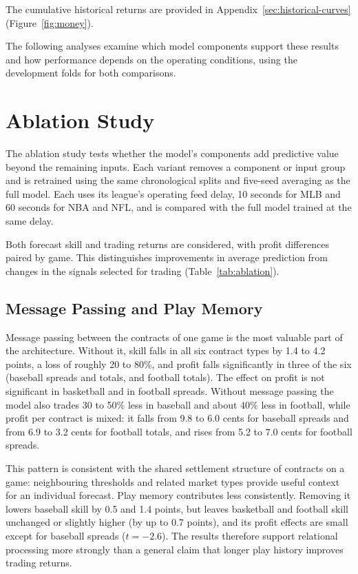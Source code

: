 \documentclass[12pt,a4paper,oneside]{report}
\begin{document}





The cumulative historical returns are provided in
Appendix~\ref{sec:historical-curves} (Figure~\ref{fig:money}).

The following analyses examine which model components support these results
and how performance depends on the operating conditions, using the development
folds for both comparisons.

\section{Ablation Study}\label{sec:ingame-ablate}
The ablation study tests whether the model's components add predictive value
beyond the remaining inputs. Each variant removes a component or input group
and is retrained using the same chronological splits and five-seed averaging
as the full model. Each uses its league's operating feed delay, 10 seconds for
MLB and 60 seconds for NBA and NFL, and is compared with the full model trained
at the same delay.

Both forecast skill and trading returns are considered, with profit differences
paired by game. This distinguishes improvements in average prediction from
changes in the signals selected for trading (Table~\ref{tab:ablation}).



\subsection{Message Passing and Play Memory}
Message passing between the contracts of one game is the most valuable part of
the architecture. Without it, skill falls in all six contract types by 1.4 to 4.2
points, a loss of roughly 20 to 80\%, and profit falls significantly in three of
the six (baseball spreads and totals, and football totals). The effect on profit is
not significant in basketball and in football spreads. Without message passing the
model also trades 30 to 50\% less in baseball and about 40\% less in football,
while profit per contract is mixed: it falls from 9.8 to 6.0 cents for baseball
spreads and from 6.9 to 3.2 cents for football totals, and rises from 5.2 to
7.0 cents for football spreads.

This pattern is consistent with the shared settlement structure of contracts
on a game: neighbouring thresholds and related market types provide useful
context for an individual forecast. Play memory contributes less consistently.
Removing it lowers baseball skill by 0.5 and 1.4 points, but leaves basketball
and football skill unchanged or slightly higher (by up to 0.7 points), and its
profit effects are small except for baseball spreads ($t=-2.6$). The results
therefore support relational processing more strongly than a general claim
that longer play history improves trading returns.
\end{document}
